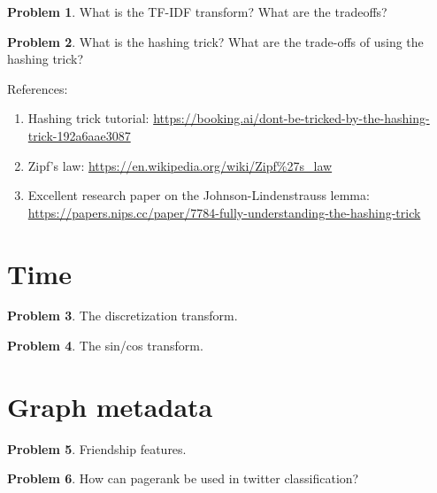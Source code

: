 \documentclass[10pt]{article}
\theoremstyle{definition}
\newtheorem{problem}{Problem}
\begin{document}
\newpage
\begin{problem}
    What is the TF-IDF transform?
    What are the tradeoffs?
\end{problem}

\newpage
\begin{problem}
    What is the hashing trick?
    What are the trade-offs of using the hashing trick?

    \noindent
    References:
    \begin{enumerate}
        \item Hashing trick tutorial: \url{https://booking.ai/dont-be-tricked-by-the-hashing-trick-192a6aae3087}
        \item Zipf's law: \url{https://en.wikipedia.org/wiki/Zipf%27s_law}

        \item Excellent research paper on the Johnson-Lindenstrauss lemma: \url{https://papers.nips.cc/paper/7784-fully-understanding-the-hashing-trick}
    \end{enumerate}
\end{problem}



\newpage
\section{Time}
\begin{problem}
    The discretization transform.
\end{problem}

\newpage
\begin{problem}
    The sin/cos transform.
\end{problem}


\newpage
\section{Graph metadata}
\begin{problem}
    Friendship features.
\end{problem}

\newpage
\begin{problem}
    How can pagerank be used in twitter classification?
\end{problem}
\end{document}
